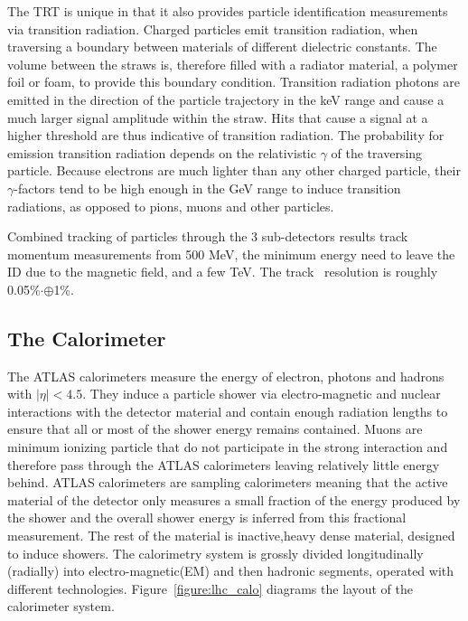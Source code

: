 The TRT is unique in that it also provides particle identification measurements via transition radiation. Charged particles emit transition radiation, when traversing a boundary between materials of different dielectric constants. The volume between the straws is, therefore filled with a radiator material, a polymer foil or foam, to provide this boundary condition. Transition radiation photons are emitted in the direction of the particle trajectory in the keV range and cause a much larger signal amplitude within the straw. Hits that cause a signal at a higher threshold are thus indicative of transition radiation.  The probability for emission transition radiation depends on the relativistic $\gamma$ of the traversing particle. Because electrons are much lighter than any other charged particle, their $\gamma$-factors tend to be high enough in the GeV range to induce transition radiations, as opposed to pions, muons and other particles. 

Combined tracking of particles through the 3 sub-detectors results track momentum measurements from 500 MeV, the minimum energy need to leave the ID due to the magnetic field, and a few TeV. The track \pt\ resolution is roughly 0.05\%$\cdot$\pt$\oplus$1\%.  

\subsection{The Calorimeter}

The ATLAS calorimeters measure the energy of electron, photons and hadrons with $|\eta|<4.5$. They induce a particle shower via electro-magnetic and nuclear interactions with the detector material and contain enough radiation lengths to ensure that all or most of the shower energy remains contained. Muons are minimum ionizing particle that do not participate in the strong interaction and therefore pass through the ATLAS calorimeters leaving relatively little energy behind. ATLAS calorimeters are sampling calorimeters meaning that the active material of the detector only measures a small fraction of the energy produced by the shower and the overall shower energy is inferred from this fractional measurement. The rest of the material is inactive,heavy dense material, designed to induce showers. The calorimetry system is grossly divided longitudinally (radially) into electro-magnetic(EM) and then hadronic segments, operated with different technologies. Figure~\ref{figure:lhc_calo} diagrams the layout of the calorimeter system.

